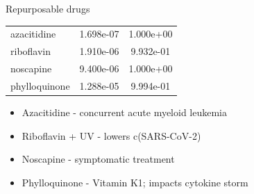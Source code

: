 \documentclass[presentation]{beamer}
\begin{document}
\begin{frame}{Repurposable drugs}
    \begin{table}%
        \begin{center}
    
        \begin{tabular}{ l S S }
        \toprule
         &  &  \\
        \midrule
        azacitidine     & 1.698e-07 & 1.000e+00             \\
        riboflavin      & 1.910e-06 & 9.932e-01             \\
        noscapine       & 9.400e-06 & 1.000e+00             \\
        phylloquinone   & 1.288e-05 & 9.994e-01             \\
        \bottomrule
        \end{tabular}
        \npnoround
        
        \end{center}
    \end{table}
    
    \begin{itemize}
        \item Azacitidine - concurrent acute myeloid leukemia 
        \item Riboflavin + UV - lowers c(SARS-CoV-2) 
        \item Noscapine - symptomatic treatment 
        \item Phylloquinone - Vitamin K1; impacts cytokine storm 
        
    \end{itemize}
    
    \vfill
    \tiny  {\parencite{Taurino_2021, Ragan_2020, Yonemura_2021, Wishart2017, Popa_2021, Dofferhoff_2020}} %
    \vspace*{0.1cm}

\end{frame}
\end{document}
